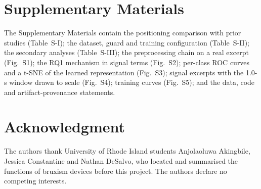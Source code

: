 \documentclass[journal]{IEEEtran}
\begin{document}
\section*{Supplementary Materials}

The Supplementary Materials contain the positioning comparison with prior studies (Table~S-I); the dataset, guard and training configuration (Table~S-II); the secondary analyses (Table~S-III); the preprocessing chain on a real excerpt (Fig.~S1); the RQ1 mechanism in signal terms (Fig.~S2); per-class ROC curves and a t-SNE of the learned representation (Fig.~S3); signal excerpts with the 1.0-s window drawn to scale (Fig.~S4); training curves (Fig.~S5); and the data, code and artifact-provenance statements.

\section*{Acknowledgment}

The authors thank University of Rhode Island students Anjolaoluwa Akingbile, Jessica Constantine and Nathan DeSalvo, who located and summarised the functions of bruxism devices before this project. The authors declare no competing interests.



\end{document}
